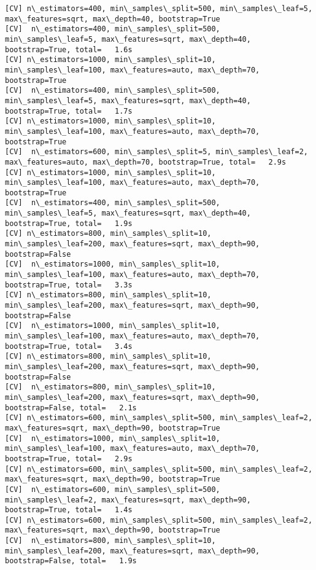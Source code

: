\documentclass[11pt]{article}
\begin{document}
\begin{Verbatim}[commandchars=\\\{\}]
[CV] n\_estimators=400, min\_samples\_split=500, min\_samples\_leaf=5, max\_features=sqrt, max\_depth=40, bootstrap=True 
[CV]  n\_estimators=400, min\_samples\_split=500, min\_samples\_leaf=5, max\_features=sqrt, max\_depth=40, bootstrap=True, total=   1.6s
[CV] n\_estimators=1000, min\_samples\_split=10, min\_samples\_leaf=100, max\_features=auto, max\_depth=70, bootstrap=True 
[CV]  n\_estimators=400, min\_samples\_split=500, min\_samples\_leaf=5, max\_features=sqrt, max\_depth=40, bootstrap=True, total=   1.7s
[CV] n\_estimators=1000, min\_samples\_split=10, min\_samples\_leaf=100, max\_features=auto, max\_depth=70, bootstrap=True 
[CV]  n\_estimators=600, min\_samples\_split=5, min\_samples\_leaf=2, max\_features=auto, max\_depth=70, bootstrap=True, total=   2.9s
[CV] n\_estimators=1000, min\_samples\_split=10, min\_samples\_leaf=100, max\_features=auto, max\_depth=70, bootstrap=True 
[CV]  n\_estimators=400, min\_samples\_split=500, min\_samples\_leaf=5, max\_features=sqrt, max\_depth=40, bootstrap=True, total=   1.9s
[CV] n\_estimators=800, min\_samples\_split=10, min\_samples\_leaf=200, max\_features=sqrt, max\_depth=90, bootstrap=False 
[CV]  n\_estimators=1000, min\_samples\_split=10, min\_samples\_leaf=100, max\_features=auto, max\_depth=70, bootstrap=True, total=   3.3s
[CV] n\_estimators=800, min\_samples\_split=10, min\_samples\_leaf=200, max\_features=sqrt, max\_depth=90, bootstrap=False 
[CV]  n\_estimators=1000, min\_samples\_split=10, min\_samples\_leaf=100, max\_features=auto, max\_depth=70, bootstrap=True, total=   3.4s
[CV] n\_estimators=800, min\_samples\_split=10, min\_samples\_leaf=200, max\_features=sqrt, max\_depth=90, bootstrap=False 
[CV]  n\_estimators=800, min\_samples\_split=10, min\_samples\_leaf=200, max\_features=sqrt, max\_depth=90, bootstrap=False, total=   2.1s
[CV] n\_estimators=600, min\_samples\_split=500, min\_samples\_leaf=2, max\_features=sqrt, max\_depth=90, bootstrap=True 
[CV]  n\_estimators=1000, min\_samples\_split=10, min\_samples\_leaf=100, max\_features=auto, max\_depth=70, bootstrap=True, total=   2.9s
[CV] n\_estimators=600, min\_samples\_split=500, min\_samples\_leaf=2, max\_features=sqrt, max\_depth=90, bootstrap=True 
[CV]  n\_estimators=600, min\_samples\_split=500, min\_samples\_leaf=2, max\_features=sqrt, max\_depth=90, bootstrap=True, total=   1.4s
[CV] n\_estimators=600, min\_samples\_split=500, min\_samples\_leaf=2, max\_features=sqrt, max\_depth=90, bootstrap=True 
[CV]  n\_estimators=800, min\_samples\_split=10, min\_samples\_leaf=200, max\_features=sqrt, max\_depth=90, bootstrap=False, total=   1.9s

\end{Verbatim}
\end{document}

